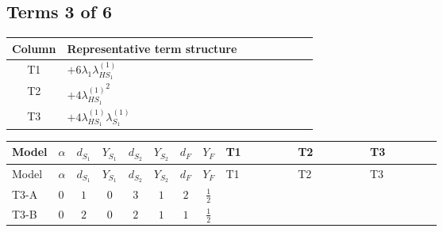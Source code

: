 \documentclass[8pt]{article}
\begin{document}
\begin{landscape}
\subsection*{Terms 3 of 6}
\begin{center}
\begin{tabular}{@{}c >{\raggedright\arraybackslash}p{0.82\linewidth}@{}}
\toprule
Column & Representative term structure \\
\midrule
T1 & \(\displaystyle +6 {\lambda_1} {\lambda_{HS_1}^{(1)}}\) \\
\midrule
T2 & \(\displaystyle +4 {\lambda_{HS_1}^{(1)}}^2\) \\
\midrule
T3 & \(\displaystyle +4 {\lambda_{HS_1}^{(1)}} {\lambda_{S_1}^{(1)}}\) \\
\midrule
\bottomrule
\end{tabular}
\end{center}
\smallskip
\tiny
\begin{longtable}{@{}llcccccc >{\raggedright\arraybackslash}p{0.21\linewidth} >{\raggedright\arraybackslash}p{0.21\linewidth} >{\raggedright\arraybackslash}p{0.21\linewidth}@{}}
\toprule
Model & $\alpha$ & $d_{S_1}$ & $Y_{S_1}$ & $d_{S_2}$ & $Y_{S_2}$ & $d_F$ & $Y_F$ & T1 & T2 & T3 \\
\midrule
\endfirsthead
\toprule
Model & $\alpha$ & $d_{S_1}$ & $Y_{S_1}$ & $d_{S_2}$ & $Y_{S_2}$ & $d_F$ & $Y_F$ & T1 & T2 & T3 \\
\midrule
\endhead
T3-A & $0$ & $1$ & $0$ & $3$ & $1$ & $2$ & $\frac{1}{2}$ & \scriptsize\adjustbox{max width=\linewidth}{$\begin{gathered} +6 {\lambda_1} {\lambda_{HS_1}^{(1)}}\end{gathered}$} & \scriptsize\adjustbox{max width=\linewidth}{$\begin{gathered} +4 {\lambda_{HS_1}^{(1)}}^2\end{gathered}$} & \scriptsize\adjustbox{max width=\linewidth}{$\begin{gathered} +4 {\lambda_{HS_1}^{(1)}} {\lambda_{S_1}^{(1)}}\end{gathered}$} \\
\midrule
T3-B & $0$ & $2$ & $0$ & $2$ & $1$ & $1$ & $\frac{1}{2}$ & \scriptsize\adjustbox{max width=\linewidth}{$\begin{gathered} +6 {\lambda_1} {\lambda_{HS_1}^{(1)}}\end{gathered}$} & \scriptsize\adjustbox{max width=\linewidth}{$\begin{gathered} +4 {\lambda_{HS_1}^{(1)}}^2\end{gathered}$} & \scriptsize\adjustbox{max width=\linewidth}{$\begin{gathered} +6 {\lambda_{HS_1}^{(1)}} {\lambda_{S_1}^{(1)}}\end{gathered}$} \\

\end{longtable}
\end{landscape}
\end{document}
